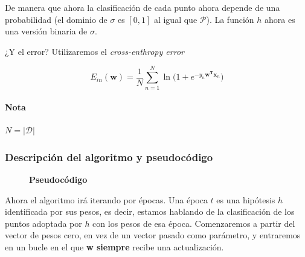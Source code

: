 \documentclass{article}
\begin{document}
    De manera que ahora la clasificación de cada punto ahora depende de una probabilidad
    (el dominio de $\sigma$ es $[0,1]$ al igual que $\mathcal{P}$).
    La función $h$ ahora es una versión binaria de $\sigma$.

    ¿Y el error? Utilizaremos el \emph{cross-enthropy error}

    \begin{equation*}
        E_{in}(\textbf{w}) = \frac{1}{N}\sum^{N}_{n=1}{\ln\bigl(1 + e^{-y_n\textbf{w}^\textbf{T}\textbf{x}_n}\bigr)}
    \end{equation*}

    \paragraph*{Nota}$N = |\mathcal{D}|$

    \pagebreak

    \subsubsection{Descripción del algoritmo y pseudocódigo}

    \begin{figure}[h]
        \textbf{Pseudocódigo}
        \begin{algorithmic}
             
             
             
            
                 
            \EndWhile

            \EndFunction
        \end{algorithmic}
    \end{figure}

    Ahora el algoritmo irá iterando por épocas.
    Una época $t$ es una hipótesis $h$ identificada por sus pesos, es decir, estamos
    hablando de la clasificación de los puntos adoptada por $h$ con los pesos de esa época.
    Comenzaremos a partir del vector de pesos cero, en vez de un vector pasado como parámetro,
    y entraremos en un bucle en el que \textbf{w siempre} recibe una actualización.
    
\end{document}

